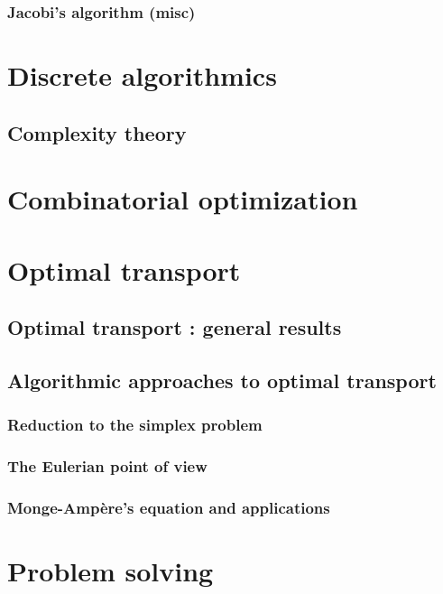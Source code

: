 \documentclass[12pt,openany,oneside]{book}
\begin{document}
\section{Jacobi's algorithm (misc)}

\part{Discrete algorithmics}

\chapter{Complexity theory}



\part{Combinatorial optimization}

\part{Optimal transport}

\chapter{Optimal transport : general  results}

\chapter{Algorithmic approaches to optimal transport}

\section{Reduction to the simplex problem}
\section{The Eulerian point of view}
\section{Monge-Ampère's equation and applications}

\part{Problem solving}
\end{document}
